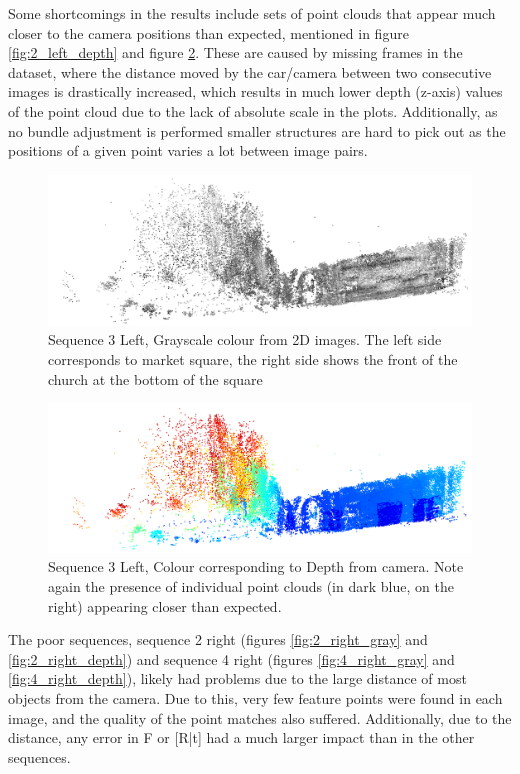 \documentclass[11pt]{article}
\begin{document}
Some shortcomings in the results include sets of point clouds that appear much closer to the camera positions than expected, mentioned in figure \ref{fig:2_left_depth} and figure \ref{fig:3_left_depth}. These are caused by missing frames in the dataset, where the distance moved by the car/camera between two consecutive images is drastically increased, which results in much lower depth (z-axis) values of the point cloud due to the lack of absolute scale in the plots. Additionally, as no bundle adjustment is performed smaller structures are hard to pick out as the positions of a given point varies a lot between image pairs.

\begin{figure}[h]
	\centering
	\includegraphics[scale=0.7]{Sequence3Left_Grayscale}
	\caption{Sequence 3 Left, Grayscale colour from 2D images. The left side corresponds to market square, the right side shows the front of the church at the bottom of the square}
	\label{fig:3_left_gray}
\end{figure}
\begin{figure}[h]
	\centering
	\includegraphics[scale=0.7]{Sequence3Left_Depth}
	\caption{Sequence 3 Left, Colour corresponding to Depth from camera. Note again the presence of individual point clouds (in dark blue, on the right) appearing closer than expected.}
	\label{fig:3_left_depth}
\end{figure}

The poor sequences, sequence 2 right (figures \ref{fig:2_right_gray} and \ref{fig:2_right_depth}) and sequence 4 right (figures \ref{fig:4_right_gray} and \ref{fig:4_right_depth}), likely had problems due to the large distance of most objects from the camera. Due to this, very few feature points were found in each image, and the quality of the point matches also suffered. Additionally, due to the distance, any error in F or [R|t] had a much larger impact than in the other sequences.
\end{document}
